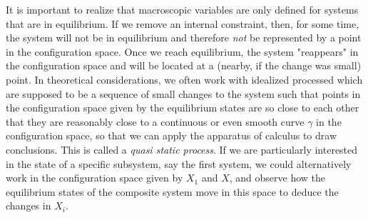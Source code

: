 \documentclass[a4paper, draft]{article}
\theoremstyle{own}
\theoremstyle{remark}
\begin{document}
It is important to realize that macroscopic variables are only defined for systems that are in equilibrium. If we remove an internal constraint,  then, for some time, the system will not be in equilibrium and therefore {\em not} be represented by a point in the configuration space. Once we reach equilibrium, the system "reappears" in the configuration space and will be located at a (nearby, if the change was small) point. In theoretical considerations, we often work with idealized processed which are supposed to be a sequence of small changes to the system such that points in the configuration space given by the equilibrium states are so close to each other that they are reasonably close to a continuous or even smooth curve $\gamma$ in the configuration space, so that we can apply the apparatus of calculus to draw conclusions. This is called a {\em quasi static process}. If we are particularly interested in the state of a specific subsystem, say the first system, we could alternatively work in the configuration space given by $X_1$ and $X$, and observe how the equilibrium states of the composite system move in this space to deduce the changes in $X_i$.
\end{document}
